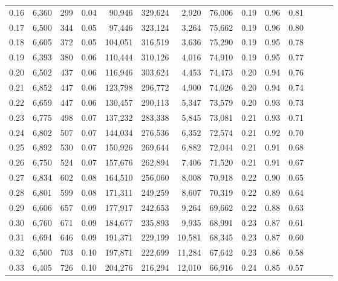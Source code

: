 \begin{tabular}{rrrrrrrrrrrrrr}
0.16 &   6,360 &    299 &  0.04 &   90,946 &  329,624 &   2,920 &  76,006 &  0.19 &  0.96 &      0.81 \\
0.17 &   6,500 &    344 &  0.05 &   97,446 &  323,124 &   3,264 &  75,662 &  0.19 &  0.96 &      0.80 \\
0.18 &   6,605 &    372 &  0.05 &  104,051 &  316,519 &   3,636 &  75,290 &  0.19 &  0.95 &      0.78 \\
0.19 &   6,393 &    380 &  0.06 &  110,444 &  310,126 &   4,016 &  74,910 &  0.19 &  0.95 &      0.77 \\
0.20 &   6,502 &    437 &  0.06 &  116,946 &  303,624 &   4,453 &  74,473 &  0.20 &  0.94 &      0.76 \\
0.21 &   6,852 &    447 &  0.06 &  123,798 &  296,772 &   4,900 &  74,026 &  0.20 &  0.94 &      0.74 \\
0.22 &   6,659 &    447 &  0.06 &  130,457 &  290,113 &   5,347 &  73,579 &  0.20 &  0.93 &      0.73 \\
0.23 &   6,775 &    498 &  0.07 &  137,232 &  283,338 &   5,845 &  73,081 &  0.21 &  0.93 &      0.71 \\
0.24 &   6,802 &    507 &  0.07 &  144,034 &  276,536 &   6,352 &  72,574 &  0.21 &  0.92 &      0.70 \\
0.25 &   6,892 &    530 &  0.07 &  150,926 &  269,644 &   6,882 &  72,044 &  0.21 &  0.91 &      0.68 \\
0.26 &   6,750 &    524 &  0.07 &  157,676 &  262,894 &   7,406 &  71,520 &  0.21 &  0.91 &      0.67 \\
0.27 &   6,834 &    602 &  0.08 &  164,510 &  256,060 &   8,008 &  70,918 &  0.22 &  0.90 &      0.65 \\
0.28 &   6,801 &    599 &  0.08 &  171,311 &  249,259 &   8,607 &  70,319 &  0.22 &  0.89 &      0.64 \\
0.29 &   6,606 &    657 &  0.09 &  177,917 &  242,653 &   9,264 &  69,662 &  0.22 &  0.88 &      0.63 \\
0.30 &   6,760 &    671 &  0.09 &  184,677 &  235,893 &   9,935 &  68,991 &  0.23 &  0.87 &      0.61 \\
0.31 &   6,694 &    646 &  0.09 &  191,371 &  229,199 &  10,581 &  68,345 &  0.23 &  0.87 &      0.60 \\
0.32 &   6,500 &    703 &  0.10 &  197,871 &  222,699 &  11,284 &  67,642 &  0.23 &  0.86 &      0.58 \\
0.33 &   6,405 &    726 &  0.10 &  204,276 &  216,294 &  12,010 &  66,916 &  0.24 &  0.85 &      0.57 \\

\end{tabular}
